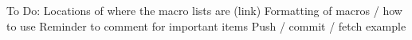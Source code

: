 

To Do:
Locations of where the macro lists are (link)
Formatting of macros / how to use
Reminder to comment for important items
Push / commit / fetch example


